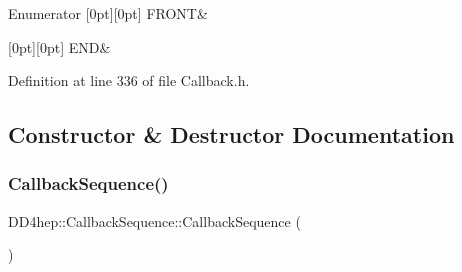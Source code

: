 \begin{DoxyEnumFields}{Enumerator}
[0pt][0pt]{}\hypertarget{struct_d_d4hep_1_1_callback_sequence_a7753490247479633aed16a2376821ef7a3aef5fe72e4b9e6f6f4b20a655e78ef2}{}\label{struct_d_d4hep_1_1_callback_sequence_a7753490247479633aed16a2376821ef7a3aef5fe72e4b9e6f6f4b20a655e78ef2} 
F\+R\+O\+NT&\\
\hline

[0pt][0pt]{}\hypertarget{struct_d_d4hep_1_1_callback_sequence_a7753490247479633aed16a2376821ef7ac39eeb1bcfc1c235ab1d0d9315c310ac}{}\label{struct_d_d4hep_1_1_callback_sequence_a7753490247479633aed16a2376821ef7ac39eeb1bcfc1c235ab1d0d9315c310ac} 
E\+ND&\\
\hline

\end{DoxyEnumFields}


Definition at line 336 of file Callback.\+h.



\subsection{Constructor \& Destructor Documentation}
\hypertarget{struct_d_d4hep_1_1_callback_sequence_aefd8cccc83fbe0ded44aea01a4da2e77}{}\label{struct_d_d4hep_1_1_callback_sequence_aefd8cccc83fbe0ded44aea01a4da2e77} 
\subsubsection{\texorpdfstring{Callback\+Sequence()}{CallbackSequence()}\hspace{0.1cm}{\footnotesize\ttfamily [1/2]}}
{\footnotesize\ttfamily D\+D4hep\+::\+Callback\+Sequence\+::\+Callback\+Sequence (\begin{DoxyParamCaption}{ }\end{DoxyParamCaption})\hspace{0.3cm}{\ttfamily [inline]}}



